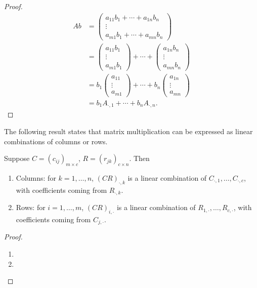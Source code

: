 \begin{proof}
\begin{align*}
Ab&=\begin{pmatrix}
a_{11}b_1+\cdots+a_{1n}b_n\\
\vdots\\
a_{m1}b_1+\cdots+a_{mn}b_n
\end{pmatrix}\\
&=\begin{pmatrix}
a_{11}b_1\\\vdots\\a_{m1}b_1
\end{pmatrix}+\cdots+\begin{pmatrix}
a_{1n}b_n\\\vdots\\a_{mn}b_n
\end{pmatrix}\\
&=b_1\begin{pmatrix}
a_{11}\\\vdots\\a_{m1}
\end{pmatrix}+\cdots+b_n\begin{pmatrix}
a_{1n}\\\vdots\\a_{mn}
\end{pmatrix}\\
&=b_1A_{\cdot,1}+\cdots+b_nA_{\cdot,n}.
\end{align*}
\end{proof}

The following result states that matrix multiplication can be expressed as linear combinations of columns or rows.

\begin{proposition}
Suppose $C=(c_{ij})_{m\times c}$, $R=(r_{jk})_{c\times n}$. Then
\begin{enumerate}[label=(\roman*)]
\item Columns: for $k=1,\dots,n$, $(CR)_{\cdot,k}$ is a linear combination of $C_{\cdot,1},\dots,C_{\cdot,c}$, with coefficients coming from $R_{\cdot,k}$.
\item Rows: for $i=1,\dots,m$, $(CR)_{i,\cdot}$ is a linear combination of $R_{1,\cdot},\dots,R_{c,\cdot}$, with coefficients coming from $C_{j,\cdot}$.
\end{enumerate}
\end{proposition}

\begin{proof} \
\begin{enumerate}[label=(\roman*)]
\item 
\item 
\end{enumerate}
\end{proof}

